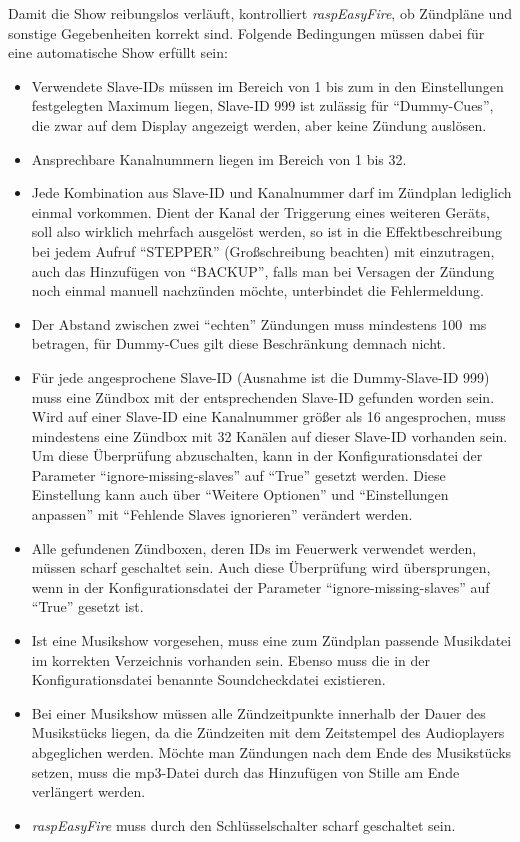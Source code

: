 \documentclass[paper=a4, parskip, numbers=noenddot, toc=listof, headsepline]{scrbook}
\newcommand{\REF}{\emph{raspEasyFire}}
\begin{document}
				Damit die Show reibungslos verläuft, kontrolliert {\REF}, ob Zündpläne und sonstige Gegebenheiten korrekt sind. Folgende Bedingungen müssen dabei für eine automatische Show erfüllt sein:
				\begin{itemize}
					\item
					      Verwendete Slave-IDs müssen im Bereich von 1 bis zum in den Einstellungen festgelegten Maximum liegen, Slave-ID 999 ist zulässig für \enquote{Dummy-Cues}, die zwar auf dem Display angezeigt werden, aber keine Zündung auslösen.
					\item
					      Ansprechbare Kanalnummern liegen im Bereich von 1 bis 32.
					\item
					      Jede Kombination aus Slave-ID und Kanalnummer darf im Zündplan lediglich einmal vorkommen. Dient der Kanal der Triggerung eines weiteren Geräts, soll also wirklich mehrfach ausgelöst werden, so ist in die Effektbeschreibung bei jedem Aufruf \enquote{STEPPER} (Großschreibung beachten) mit einzutragen, auch das Hinzufügen von \enquote{BACKUP}, falls man bei Versagen der Zündung noch einmal manuell nachzünden möchte, unterbindet die Fehlermeldung.
					\item
					      Der Abstand zwischen zwei \enquote{echten} Zündungen muss mindestens \SI{100}{\milli\second} betragen, für Dummy-Cues gilt diese Beschränkung demnach nicht.
					\item
					      Für jede angesprochene Slave-ID (Ausnahme ist die Dummy-Slave-ID 999) muss eine Zündbox mit der entsprechenden Slave-ID gefunden worden sein. Wird auf einer Slave-ID eine Kanalnummer größer als 16 angesprochen, muss mindestens eine Zündbox mit 32 Kanälen auf dieser Slave-ID vorhanden sein. Um diese Überprüfung abzuschalten, kann in der Konfigurationsdatei der Parameter \enquote{ignore-missing-slaves} auf \enquote{True} gesetzt werden. Diese Einstellung kann auch über \enquote{Weitere Optionen} und \enquote{Einstellungen anpassen} mit \enquote{Fehlende Slaves ignorieren} verändert werden.
					\item
					      Alle gefundenen Zündboxen, deren IDs im Feuerwerk verwendet werden, müssen scharf geschaltet sein. Auch diese Überprüfung wird übersprungen, wenn in der Konfigurationsdatei der Parameter \enquote{ignore-missing-slaves} auf \enquote{True} gesetzt ist.
					\item
					      Ist eine Musikshow vorgesehen, muss eine zum Zündplan passende Musikdatei im korrekten Verzeichnis vorhanden sein. Ebenso muss die in der Konfigurationsdatei benannte Soundcheckdatei existieren.
					\item
					      Bei einer Musikshow müssen alle Zündzeitpunkte innerhalb der Dauer des Musikstücks liegen, da die Zündzeiten mit dem Zeitstempel des Audioplayers abgeglichen werden. Möchte man Zündungen nach dem Ende des Musikstücks setzen, muss die mp3-Datei durch das Hinzufügen von Stille am Ende verlängert werden.
					\item
					      {\REF} muss durch den Schlüsselschalter scharf geschaltet sein.
				\end{itemize}
\end{document}
